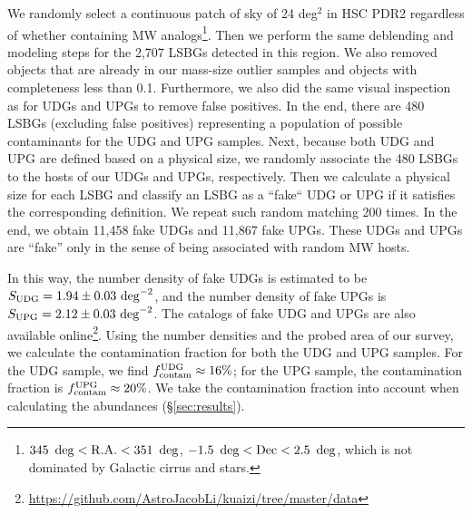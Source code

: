 \documentclass[twocolumn,astrosymb,twocolappendix]{aastex631}
\begin{document}
\begin{CJK*}{UTF8}{gbsn}
We randomly select a continuous patch of sky of 24 deg$^{2}$ in HSC PDR2 regardless of whether containing MW analogs\footnote{$345\ \deg < \rm{R.A.} < 351\ \deg$, $-1.5\ \deg < \rm{Dec} < 2.5\ \deg$, which is not dominated by Galactic cirrus and stars.}. Then we perform the same deblending and modeling steps for the 2,707 LSBGs detected in this region. We also removed objects that are already in our mass-size outlier samples and objects with completeness less than 0.1. Furthermore, we also did the same visual inspection as for UDGs and UPGs to remove false positives. In the end, there are 480 LSBGs (excluding false positives) representing a population of possible contaminants for the UDG and UPG samples. Next, because both UDG and UPG are defined based on a physical size, we randomly associate the 480 LSBGs to the hosts of our UDGs and UPGs, respectively. Then we calculate a physical size for each LSBG and classify an LSBG as a ``fake`` UDG or UPG if it satisfies the corresponding definition. We repeat such random matching 200 times. In the end, we obtain 11,458 fake UDGs and 11,867 fake UPGs. These UDGs and UPGs are ``fake'' only in the sense of being associated with random MW hosts. 

In this way, the number density of fake UDGs is estimated to be $S_{\rm UDG} = 1.94\pm0.03\ \mathrm{deg}^{-2}$, and the number density of fake UPGs is $S_{\rm UPG} = 2.12\pm0.03\ \mathrm{deg}^{-2}$. The catalogs of fake UDG and UPGs are also available online\footnote{\url{https://github.com/AstroJacobLi/kuaizi/tree/master/data}}. Using the number densities and the probed area of our survey, we calculate the contamination fraction for both the UDG and UPG samples. For the UDG sample, we find $f_{\rm contam}^{\rm UDG} \approx 16\%$; for the UPG sample, the contamination fraction is $f_{\rm contam}^{\rm UPG} \approx 20\%$. We take the contamination fraction into account when calculating the abundances (\S\ref{sec:results}).


\end{CJK*}
\end{document}
